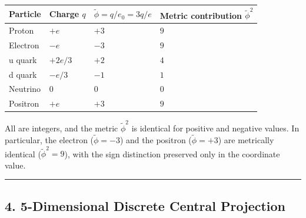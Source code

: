 \documentclass[a4paper,11pt]{article}
\theoremstyle{definition}
\begin{document}
{\def\LTcaptype{none} %
\begin{longtable}[]{@{}
  >{\raggedright\arraybackslash}p{}
  >{\raggedright\arraybackslash}p{}
  >{\raggedright\arraybackslash}p{}
  >{\raggedright\arraybackslash}p{}@{}}
\toprule\noalign{}
\begin{minipage}[b]{\linewidth}\raggedright
Particle
\end{minipage} & \begin{minipage}[b]{\linewidth}\raggedright
Charge \(q\)
\end{minipage} & \begin{minipage}[b]{\linewidth}\raggedright
\(\tilde{\phi} = q/e_0 = 3q/e\)
\end{minipage} & \begin{minipage}[b]{\linewidth}\raggedright
Metric contribution \(\tilde{\phi}^2\)
\end{minipage} \\
\midrule\noalign{}
\endhead
\bottomrule\noalign{}
\endlastfoot
Proton & \(+e\) & \(+3\) & \(9\) \\
Electron & \(-e\) & \(-3\) & \(9\) \\
u quark & \(+2e/3\) & \(+2\) & \(4\) \\
d quark & \(-e/3\) & \(-1\) & \(1\) \\
Neutrino & \(0\) & \(0\) & \(0\) \\
Positron & \(+e\) & \(+3\) & \(9\) \\
\end{longtable}
}

All are integers, and the metric \(\tilde{\phi}^2\) is identical for positive and negative values. In particular, the electron (\(\tilde{\phi} = -3\)) and the positron (\(\tilde{\phi} = +3\)) are metrically identical (\(\tilde{\phi}^2 = 9\)), with the sign distinction preserved only in the coordinate value.

\begin{center}\rule{0.5\linewidth}{0.5pt}\end{center}

\subsection{4. 5-Dimensional Discrete Central Projection}\label{dimensional-discrete-central-projection}
\end{document}
